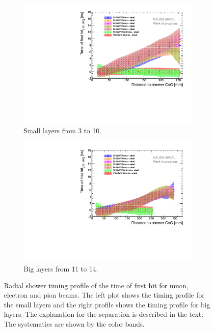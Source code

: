 \begin{figure}[htbp!]
	\begin{subfigure}[t]{0.45\textwidth}
		\centering
		\includegraphics[width=1\textwidth]{chap5/fig_AHCAL_timing/Pions/Timing_Radius_Comparison_ShortAsymRange_SSF.pdf}
		\caption{Small layers from 3 to 10.}\label{fig:Radius_Comparison_SSF}
	\end{subfigure}
	\hfill
	\begin{subfigure}[t]{0.45\textwidth}
		\centering
		\includegraphics[width=1\textwidth]{chap5/fig_AHCAL_timing/Pions/Timing_Radius_Comparison_ShortAsymRange_BL.pdf}
		\caption{Big layers from 11 to 14.}\label{fig:Radius_Comparison_BL}
	\end{subfigure}
	\caption{Radial shower timing profile of the time of first hit for muon, electron and pion beams. The left plot shows the timing profile for the small layers and the right profile shows the timing profile for big layers. The explanation for the separation is described in the text. The systematics are shown by the color bands.}
	\label{fig:RadialTiming}
\end{figure}

